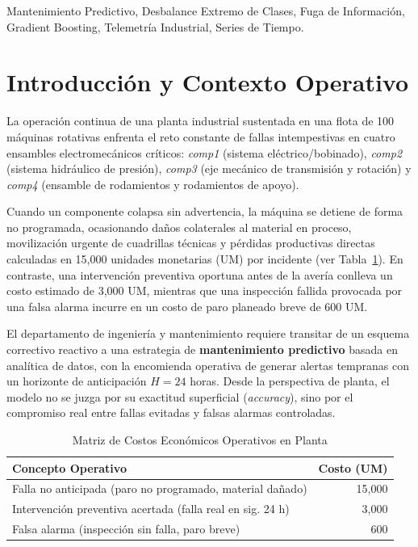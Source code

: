 \documentclass[conference]{IEEEtran}
\begin{document}
\begin{IEEEkeywords}
Mantenimiento Predictivo, Desbalance Extremo de Clases, Fuga de Información, Gradient Boosting, Telemetría Industrial, Series de Tiempo.
\end{IEEEkeywords}

\section{Introducción y Contexto Operativo}
La operación continua de una planta industrial sustentada en una flota de 100 máquinas rotativas enfrenta el reto constante de fallas intempestivas en cuatro ensambles electromecánicos críticos: \textit{comp1} (sistema eléctrico/bobinado), \textit{comp2} (sistema hidráulico de presión), \textit{comp3} (eje mecánico de transmisión y rotación) y \textit{comp4} (ensamble de rodamientos y rodamientos de apoyo). 

Cuando un componente colapsa sin advertencia, la máquina se detiene de forma no programada, ocasionando daños colaterales al material en proceso, movilización urgente de cuadrillas técnicas y pérdidas productivas directas calculadas en 15,000 unidades monetarias (UM) por incidente (ver Tabla~\ref{tab:costos}). En contraste, una intervención preventiva oportuna antes de la avería conlleva un costo estimado de 3,000 UM, mientras que una inspección fallida provocada por una falsa alarma incurre en un costo de paro planeado breve de 600 UM. 

El departamento de ingeniería y mantenimiento requiere transitar de un esquema correctivo reactivo a una estrategia de \textbf{mantenimiento predictivo} basada en analítica de datos, con la encomienda operativa de generar alertas tempranas con un horizonte de anticipación $H = 24$ horas. Desde la perspectiva de planta, el modelo no se juzga por su exactitud superficial (\textit{accuracy}), sino por el compromiso real entre fallas evitadas y falsas alarmas controladas.

\begin{table}[htbp]
\caption{Matriz de Costos Económicos Operativos en Planta}
\label{tab:costos}
\centering
\begin{tabular}{lr}
\toprule
\textbf{Concepto Operativo} & \textbf{Costo (UM)} \\
\midrule
Falla no anticipada (paro no programado, material dañado) & 15,000 \\
Intervención preventiva acertada (falla real en sig. 24 h) & 3,000 \\
Falsa alarma (inspección sin falla, paro breve) & 600 \\
\bottomrule
\end{tabular}
\end{table}
\end{document}
